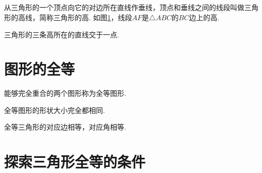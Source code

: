 \documentclass[fontset=windows]{ctexrep}
\begin{document}
\subsection{}
从三角形的一个顶点向它的对边所在直线作垂线，顶点和垂线之间的线段叫做{\heiti 三角形的高线}，简称{\heiti 三角形的高}. 如图\ref{fig:三角形高}，线段$AF$是$\triangle ABC$的$BC$边上的高.
\begin{figure}[htbp]
    \centering
    \caption{}
    \label{fig:三角形高}
\end{figure}
\par {\heiti 三角形的三条高所在的直线交于一点.}
\section{图形的全等}
\par 能够完全重合的两个图形称为{\heiti 全等图形}.
\par {\heiti 全等图形的形状大小完全都相同.}
\par {\heiti 全等三角形的对应边相等，对应角相等.}
\section{探索三角形全等的条件}
\par 
\end{document}
